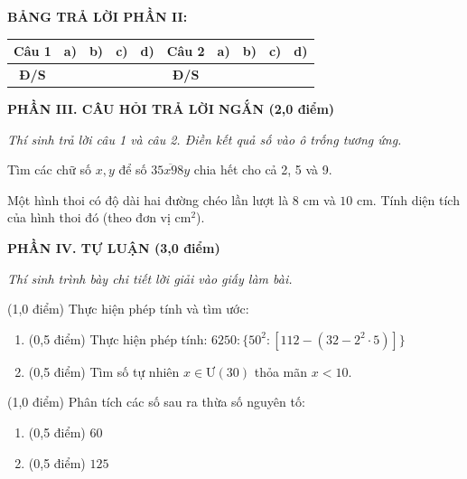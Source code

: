 \documentclass[12pt,a4paper]{article}
\begin{document}
\noindent\textbf{BẢNG TRẢ LỜI PHẦN II:}
\begin{center}
\begin{tabular}{|c|c|c|c|c||c|c|c|c|c|}
\hline
\textbf{Câu 1} & \textbf{a)} & \textbf{b)} & \textbf{c)} & \textbf{d)} & \textbf{Câu 2} & \textbf{a)} & \textbf{b)} & \textbf{c)} & \textbf{d)} \\
\hline
\textbf{Đ/S} & \rule{0pt}{0.6cm} & & & & \textbf{Đ/S} & & & & \\
\hline
\end{tabular}
\end{center}
\vspace{2mm}

\setcounter{ex}{0}
\noindent\textbf{\large PHẦN III. CÂU HỎI TRẢ LỜI NGẮN (2,0 điểm)}

\textit{Thí sinh trả lời câu 1 và câu 2. Điền kết quả số vào ô trống tương ứng.}

\vspace{1mm}
\begin{ex}
Tìm các chữ số $x, y$ để số $\overline{35x98y}$ chia hết cho cả 2, 5 và 9. 
\end{ex}

\begin{ex}
Một hình thoi có độ dài hai đường chéo lần lượt là $8\text{ cm}$ và $10\text{ cm}$. Tính diện tích của hình thoi đó (theo đơn vị $\text{cm}^2$). 
\end{ex}


\setcounter{ex}{0}
\noindent\textbf{\large PHẦN IV. TỰ LUẬN (3,0 điểm)}

\textit{Thí sinh trình bày chi tiết lời giải vào giấy làm bài.}

\vspace{1mm}
\begin{ex} (1,0 điểm)
Thực hiện phép tính và tìm ước:
\begin{enumerate}[label=\textbf{\alph*)}, leftmargin=0.8cm, itemsep=2pt]
\item (0,5 điểm) Thực hiện phép tính: $6250 : \{50^2 : [112 - (32 - 2^2 \cdot 5)]\}$
\item (0,5 điểm) Tìm số tự nhiên $x \in Ư(30)$ thỏa mãn $x < 10$.
\end{enumerate}
\end{ex}
\vspace{1.5mm}

\begin{ex} (1,0 điểm)
Phân tích các số sau ra thừa số nguyên tố:
\begin{enumerate}[label=\textbf{\alph*)}, leftmargin=0.8cm, itemsep=2pt]
\item (0,5 điểm) $60$
\item (0,5 điểm) $125$
\end{enumerate}
\end{ex}
\vspace{1.5mm}
\end{document}
